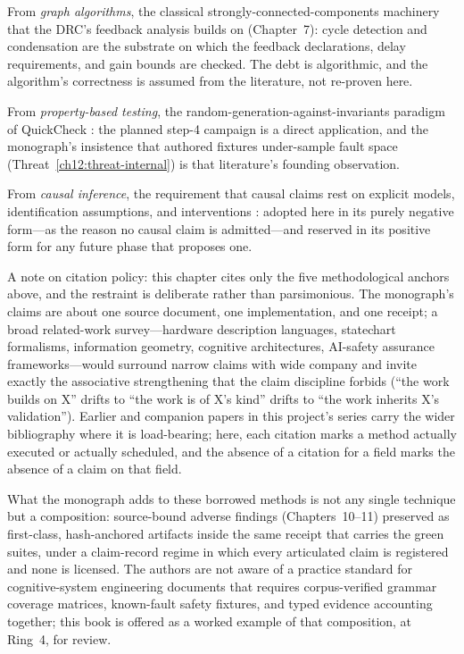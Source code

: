 From \emph{graph algorithms}, the classical strongly-connected-components machinery \cite{tarjan} that the DRC's feedback analysis builds on (Chapter~7): cycle detection and condensation are the substrate on which the feedback declarations, delay requirements, and gain bounds are checked. The debt is algorithmic, and the algorithm's correctness is assumed from the literature, not re-proven here.

From \emph{property-based testing}, the random-generation-against-invariants paradigm of QuickCheck \cite{quickcheck}: the planned step-4 campaign is a direct application, and the monograph's insistence that authored fixtures under-sample fault space (Threat~\ref{ch12:threat-internal}) is that literature's founding observation.

From \emph{causal inference}, the requirement that causal claims rest on explicit models, identification assumptions, and interventions \cite{pearl}: adopted here in its purely negative form---as the reason no causal claim is admitted---and reserved in its positive form for any future phase that proposes one.

A note on citation policy: this chapter cites only the five methodological anchors above, and the restraint is deliberate rather than parsimonious. The monograph's claims are about one source document, one implementation, and one receipt; a broad related-work survey---hardware description languages, statechart formalisms, information geometry, cognitive architectures, AI-safety assurance frameworks---would surround narrow claims with wide company and invite exactly the associative strengthening that the claim discipline forbids (``the work builds on X'' drifts to ``the work is of X's kind'' drifts to ``the work inherits X's validation''). Earlier and companion papers in this project's series carry the wider bibliography where it is load-bearing; here, each citation marks a method actually executed or actually scheduled, and the absence of a citation for a field marks the absence of a claim on that field.

What the monograph adds to these borrowed methods is not any single technique but a composition: source-bound adverse findings (Chapters~10--11) preserved as first-class, hash-anchored artifacts inside the same receipt that carries the green suites, under a claim-record regime in which every articulated claim is registered and none is licensed. The authors are not aware of a practice standard for cognitive-system engineering documents that requires corpus-verified grammar coverage matrices, known-fault safety fixtures, and typed evidence accounting together; this book is offered as a worked example of that composition, at Ring~4, for review.

